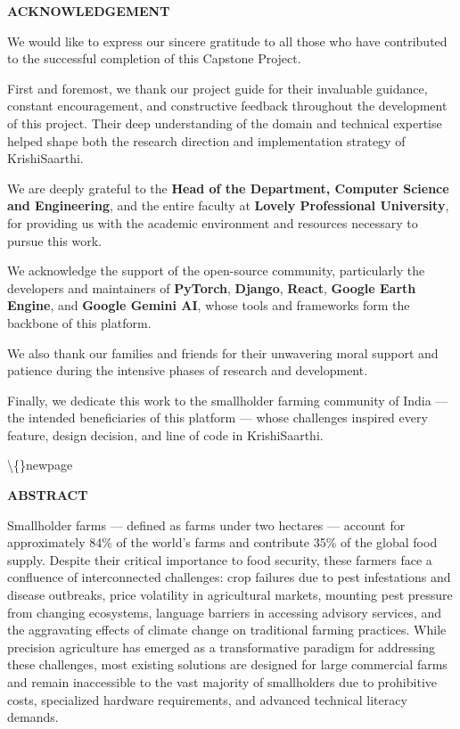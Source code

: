 \documentclass[12pt, a4paper]{report}
\begin{document}
\begin{center}
{\fontsize{14}{17}\bfseries ACKNOWLEDGEMENT}\\
\end{center}
We would like to express our sincere gratitude to all those who have contributed to the successful completion of this Capstone Project.

First and foremost, we thank our project guide for their invaluable guidance, constant encouragement, and constructive feedback throughout the development of this project. Their deep understanding of the domain and technical expertise helped shape both the research direction and implementation strategy of KrishiSaarthi.

We are deeply grateful to the \textbf{Head of the Department, Computer Science and Engineering}, and the entire faculty at \textbf{Lovely Professional University}, for providing us with the academic environment and resources necessary to pursue this work.

We acknowledge the support of the open-source community, particularly the developers and maintainers of \textbf{PyTorch}, \textbf{Django}, \textbf{React}, \textbf{Google Earth Engine}, and \textbf{Google Gemini AI}, whose tools and frameworks form the backbone of this platform.

We also thank our families and friends for their unwavering moral support and patience during the intensive phases of research and development.

Finally, we dedicate this work to the smallholder farming community of India --- the intended beneficiaries of this platform --- whose challenges inspired every feature, design decision, and line of code in KrishiSaarthi.

\textbackslash\{\}newpage

\begin{center}
{\fontsize{14}{17}\bfseries ABSTRACT}\\
\end{center}
Smallholder farms --- defined as farms under two hectares --- account for approximately 84\% of the world's farms and contribute 35\% of the global food supply. Despite their critical importance to food security, these farmers face a confluence of interconnected challenges: crop failures due to pest infestations and disease outbreaks, price volatility in agricultural markets, mounting pest pressure from changing ecosystems, language barriers in accessing advisory services, and the aggravating effects of climate change on traditional farming practices. While precision agriculture has emerged as a transformative paradigm for addressing these challenges, most existing solutions are designed for large commercial farms and remain inaccessible to the vast majority of smallholders due to prohibitive costs, specialized hardware requirements, and advanced technical literacy demands.
\end{document}

